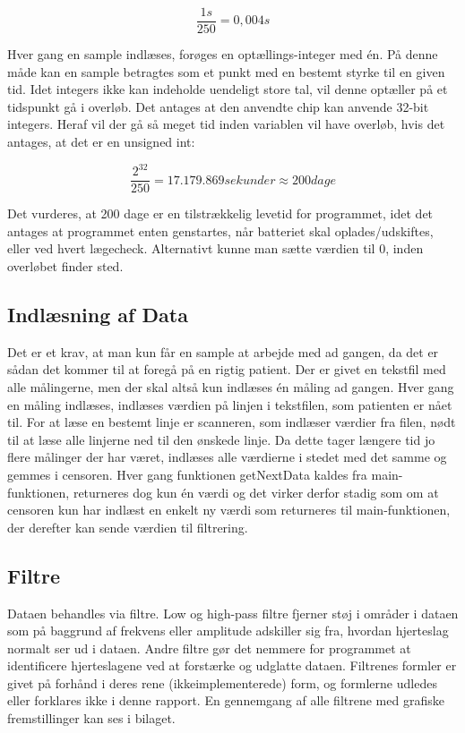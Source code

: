 \documentclass{article}
\begin{document}
\begin{equation} 
\frac{1s}{250} = 0,004s
\end{equation}

Hver gang en sample indlæses, forøges en optællings-integer med én. På denne måde kan en sample betragtes som et punkt med en bestemt styrke til en given tid. Idet integers ikke kan indeholde uendeligt store tal, vil denne optæller på et tidspunkt gå i overløb. Det antages at den anvendte chip kan anvende 32-bit integers. Heraf vil der gå så meget tid inden variablen vil have overløb, hvis det antages, at det er en unsigned int:

\begin{equation}
\frac{2^{32}}{250} = 17.179.869 sekunder \approx 200 dage
\end{equation}

Det vurderes, at 200 dage er en tilstrækkelig levetid for programmet, idet det antages at programmet enten genstartes, når batteriet skal oplades/udskiftes, eller ved hvert lægecheck. Alternativt kunne man sætte værdien til 0, inden overløbet finder sted.

\subsection{Indlæsning af Data}
Det er et krav, at man kun får en sample at arbejde med ad gangen, da det er sådan det kommer til at foregå på en rigtig patient. Der er givet en tekstfil med alle målingerne, men der skal altså kun indlæses én måling ad gangen. Hver gang en måling indlæses, indlæses værdien på linjen i tekstfilen, som patienten er nået til. For at læse en bestemt linje er scanneren, som indlæser værdier fra filen, nødt til at læse alle linjerne ned til den ønskede linje. Da dette tager længere tid jo flere målinger der har været, indlæses alle værdierne i stedet med det samme og gemmes i censoren. Hver gang funktionen getNextData kaldes fra main-funktionen, returneres dog kun én værdi og det virker derfor stadig som om at censoren kun har indlæst en enkelt ny værdi som returneres til main-funktionen, der derefter kan sende værdien til filtrering.

\subsection{Filtre}
Dataen behandles via filtre. Low og high-pass filtre fjerner støj i områder i dataen som på baggrund af frekvens eller amplitude adskiller sig fra, hvordan hjerteslag normalt ser ud i dataen. Andre filtre gør det nemmere for programmet at identificere hjerteslagene ved at forstærke og udglatte dataen. Filtrenes formler er givet på forhånd i deres rene (ikkeimplementerede) form, og formlerne udledes eller forklares ikke i denne rapport. En gennemgang af alle filtrene med grafiske fremstillinger kan ses i bilaget.
\end{document}
